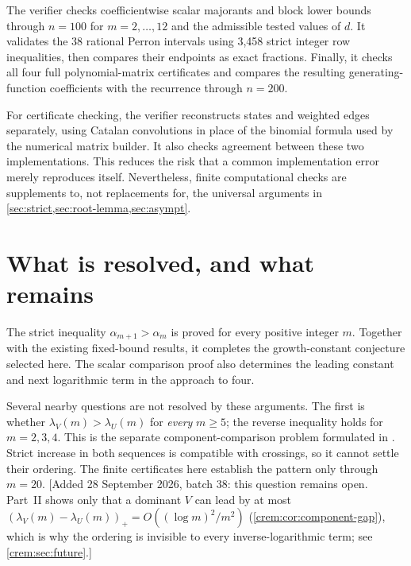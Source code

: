 \documentclass[11pt,a4paper]{article}
\theoremstyle{definition}\newaliascnt{definition}{theorem}
\theoremstyle{remark}\newaliascnt{remark}{theorem}
\begin{document}
The verifier checks coefficientwise scalar majorants and block lower bounds
through $n=100$ for $m=2,\ldots,12$ and the admissible tested values of $d$.
It validates the 38 rational Perron intervals using 3,458 strict integer
row inequalities, then compares their endpoints as exact fractions.
Finally, it checks all four full polynomial-matrix certificates and compares
the resulting generating-function coefficients with the recurrence through
$n=200$.

For certificate checking, the verifier reconstructs states and weighted
edges separately, using Catalan convolutions in place of the binomial
formula used by the numerical matrix builder. It also checks agreement
between these two implementations. This reduces the risk that a common
implementation error merely reproduces itself. Nevertheless,
finite computational checks are supplements to, not replacements for,
the universal arguments in \cref{sec:strict,sec:root-lemma,sec:asympt}.

\section{What is resolved, and what remains}
\label{sec:remaining}
The strict inequality $\alpha_{m+1}>\alpha_m$ is proved for every positive
integer $m$. Together with the existing fixed-bound results, it completes
the growth-constant conjecture selected here. The scalar comparison proof
also determines the leading constant and next logarithmic term in the
approach to four.

Several nearby questions are not resolved by these arguments. The first
is whether $\lambda_V(m)>\lambda_U(m)$ for \emph{every} $m\ge5$; the reverse
inequality holds for $m=2,3,4$. This is the separate component-comparison
problem formulated in \cite[Problem~P3]{MayamaAkita}. Strict increase in
both sequences is compatible with crossings, so it cannot settle their
ordering. The finite certificates here establish the pattern only through
$m=20$.
[Added 28 September 2026, batch 38: this question remains open. Part~II
shows only that a dominant $V$ can lead by at most
$(\lambda_V(m)-\lambda_U(m))_+=O((\log m)^2/m^2)$
(\cref{crem:cor:component-gap}), which is why the ordering is invisible to
every inverse-logarithmic term; see \cref{crem:sec:future}.]
\end{document}
